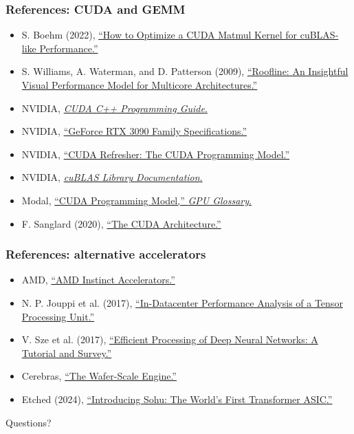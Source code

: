 \documentclass[main.tex]{subfiles}
\begin{document}
\begin{frame}
  \frametitle{References: CUDA and GEMM}
  \small
  \begin{itemize}
    \item S. Boehm (2022), \href{https://siboehm.com/articles/22/CUDA-MMM}{``How to Optimize a CUDA Matmul Kernel for cuBLAS-like Performance.''}
    \item S. Williams, A. Waterman, and D. Patterson (2009), \href{https://doi.org/10.1145/1498765.1498785}{``Roofline: An Insightful Visual Performance Model for Multicore Architectures.''}
    \item NVIDIA, \href{https://docs.nvidia.com/cuda/cuda-c-programming-guide/}{\emph{CUDA C++ Programming Guide}.}
    \item NVIDIA, \href{https://www.nvidia.com/en-us/geforce/graphics-cards/30-series/rtx-3090-3090ti/}{``GeForce RTX 3090 Family Specifications.''}
    \item NVIDIA, \href{https://developer.nvidia.com/blog/cuda-refresher-cuda-programming-model/}{``CUDA Refresher: The CUDA Programming Model.''}
    \item NVIDIA, \href{https://docs.nvidia.com/cuda/cublas/}{\emph{cuBLAS Library Documentation}.}
    \item Modal, \href{https://modal.com/gpu-glossary/device-software/cuda-programming-model}{``CUDA Programming Model,'' \emph{GPU Glossary}.}
    \item F. Sanglard (2020), \href{https://fabiensanglard.net/cuda/}{``The CUDA Architecture.''}
  \end{itemize}
\end{frame}

\begin{frame}
  \frametitle{References: alternative accelerators}
  \footnotesize
  \begin{itemize}
    \item AMD, \href{https://www.amd.com/en/products/accelerators/instinct.html}{``AMD Instinct Accelerators.''}
    \item N. P. Jouppi et al. (2017), \href{https://doi.org/10.1145/3079856.3080246}{``In-Datacenter Performance Analysis of a Tensor Processing Unit.''}
    \item V. Sze et al. (2017), \href{https://doi.org/10.1109/JPROC.2017.2761740}{``Efficient Processing of Deep Neural Networks: A Tutorial and Survey.''}
    \item Cerebras, \href{https://www.cerebras.ai/chip}{``The Wafer-Scale Engine.''}
    \item Etched (2024), \href{https://www.etched.com/announcing-sohu}{``Introducing Sohu: The World's First Transformer ASIC.''}
  \end{itemize}

  \vfill
  \centering
  \large Questions?
\end{frame}
\end{document}
